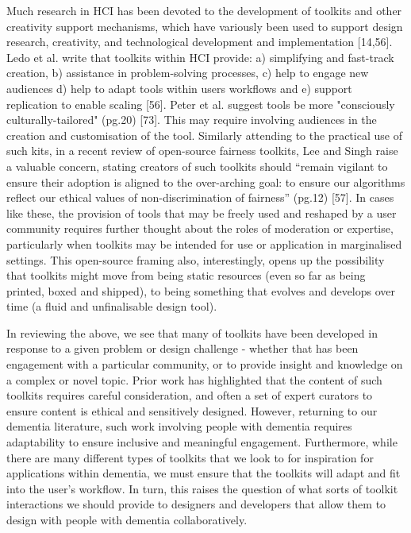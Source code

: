Much research in HCI has been devoted to the development of toolkits and other creativity support mechanisms, which have variously been used to support design research, creativity, and technological development and implementation [14,56]. Ledo et al. write that toolkits within HCI provide: a) simplifying and fast-track creation, b) assistance in problem-solving processes, c) help to engage new audiences d) help to adapt tools within users workflows and e) support replication to enable scaling [56]. Peter et al. suggest tools be more "consciously culturally-tailored" (pg.20) [73]. This may require involving audiences in the creation and customisation of the tool. Similarly attending to the practical use of such kits, in a recent review of open-source fairness toolkits, Lee and Singh raise a valuable concern, stating creators of such toolkits should “remain vigilant to ensure their adoption is aligned to the over-arching goal: to ensure our algorithms reflect our ethical values of non-discrimination of fairness” (pg.12) [57]. In cases like these, the provision of tools that may be freely used and reshaped by a user community requires further thought about the roles of moderation or expertise, particularly when toolkits may be intended for use or application in marginalised settings. This open-source framing also, interestingly, opens up the possibility that toolkits might move from being static resources (even so far as being printed, boxed and shipped), to being something that evolves and develops over time (a fluid and unfinalisable design tool).

In reviewing the above, we see that many of toolkits have been developed in response to a given problem or design challenge - whether that has been engagement with a particular community, or to provide insight and knowledge on a complex or novel topic. Prior work has highlighted that the content of such toolkits requires careful consideration, and often a set of expert curators to ensure content is ethical and sensitively designed. However, returning to our dementia literature, such work involving people with dementia requires adaptability to ensure inclusive and meaningful engagement. Furthermore, while there are many different types of toolkits that we look to for inspiration for applications within dementia, we must ensure that the toolkits will adapt and fit into the user’s workflow. In turn, this raises the question of what sorts of toolkit interactions we should provide to designers and developers that allow them to design with people with dementia collaboratively.


